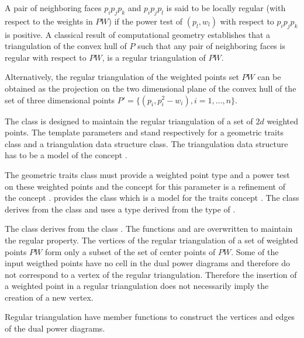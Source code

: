 A pair of neighboring faces $p_ip_jp_k$
and $p_ip_jp_l$ is said to be locally regular
(with respect to  the weights in ${  PW}$)
if the power test of $(p_l,w_l)$ with respect to
$p_ip_jp_k$ is positive.
A classical  result of computational geometry
establishes that a triangulation of the convex hull of ${  P}$
such that any pair of neighboring faces is regular with respect
to ${  PW}$, is a
 regular triangulation of ${  PW}$.

Alternatively, the regular triangulation
of the weighted points set ${  PW}$
can be obtained as the projection
on the two dimensional plane of the convex hull of the set of three
dimensional points 
${  P'}= \{ (p_i,p_i ^2 - w_i ), i = 1, \ldots , n \}$.

The class 
 is designed to maintain the
regular triangulation of a set of $2d$ weighted points.
The template parameters   and  stand respectively
 for a geometric traits class and a triangulation data structure class.
The triangulation data structure has to be a model of the concept
.

The geometric traits class must provide a weighted point type
and a power test on these weighted points
and the concept for this parameter
is a refinement of the concept
. \cgal provides 
the class
which is a model for the traits concept
.
The class 
derives  from the class
and uses a  type
derived from the type  of
.


The class 
derives from the class .
The functions  and 
 are overwritten to maintain the regular
property.
The vertices of the regular triangulation
of a set of weighted points ${  PW}$ form only a subset
of the set of center points of ${   PW}$.
Some of the input
weigthed points have no cell in the dual power diagrams
and therefore do not correspond to a vertex of the regular
triangulation.
Therefore the  insertion of a weighted point  in a regular triangulation
does not necessarily imply the creation of a new vertex.

Regular triangulation have member functions to construct
the vertices and edges of the dual power diagrams.



